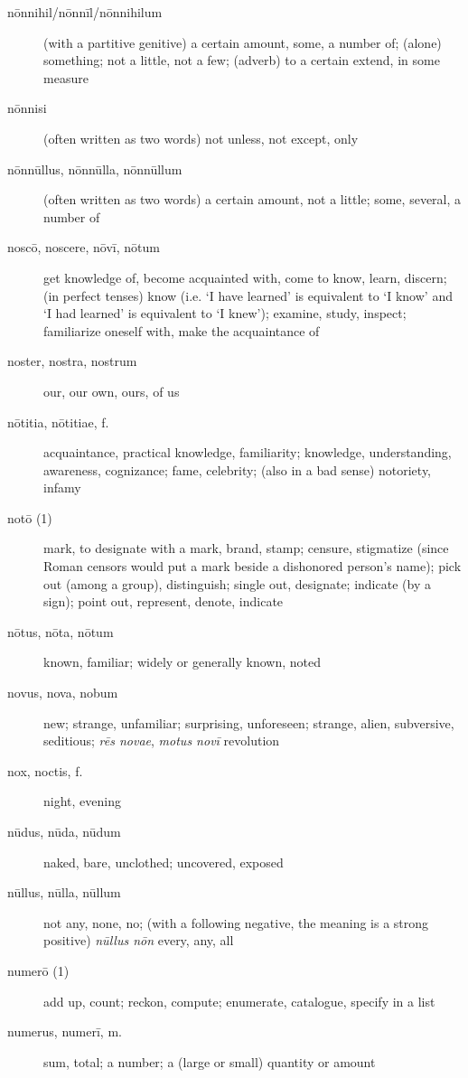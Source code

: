 \begin{description}
    \item[nōnnihil/nōnnīl/nōnnihilum] (with a partitive genitive) a certain amount, some, a number of; (alone) something; not a little, not a few; (adverb) to a certain extend, in some measure
    \item[nōnnisi] (often written as two words) not unless, not except, only
    \item[nōnnūllus, nōnnūlla, nōnnūllum] (often written as two words) a certain amount, not a little; some, several, a number of
    \item[noscō, noscere, nōvī, nōtum] \marginnote{*}get knowledge of, become acquainted with, come to know, learn, discern; (in perfect tenses) know (i.e. `I have learned' is equivalent to `I know' and `I had learned' is equivalent to `I knew'); examine, study, inspect; familiarize oneself with, make the acquaintance of
    \item[noster, nostra, nostrum] \marginnote{*}our, our own, ours, of us
    \item[nōtitia, nōtitiae, f.] acquaintance, practical knowledge, familiarity; knowledge, understanding, awareness, cognizance; fame, celebrity; (also in a bad sense) notoriety, infamy
    \item[notō (1)] mark, to designate with a mark, brand, stamp; censure, stigmatize (since Roman censors would put a mark beside a dishonored person's name); pick out (among a group), distinguish; single out, designate; indicate (by a sign); point out, represent, denote, indicate
    \item[nōtus, nōta, nōtum] \marginnote{*}known, familiar; widely or generally known, noted
    \item[novus, nova, nobum] \marginnote{*}new; strange, unfamiliar; surprising, unforeseen; strange, alien, subversive, seditious; \textit{rēs novae}, \textit{motus novī} revolution
    \item[nox, noctis, f.] \marginnote{*}night, evening
    \item[nūdus, nūda, nūdum] \marginnote{*}naked, bare, unclothed; uncovered, exposed
    \item[nūllus, nūlla, nūllum] \marginnote{*}not any, none, no; (with a following negative, the meaning is a strong positive) \textit{nūllus nōn} every, any, all
    \item[numerō (1)] add up, count; reckon, compute; enumerate, catalogue, specify in a list
    \item[numerus, numerī, m.] \marginnote{*}sum, total; a number; a (large or small) quantity or amount

\end{description}
